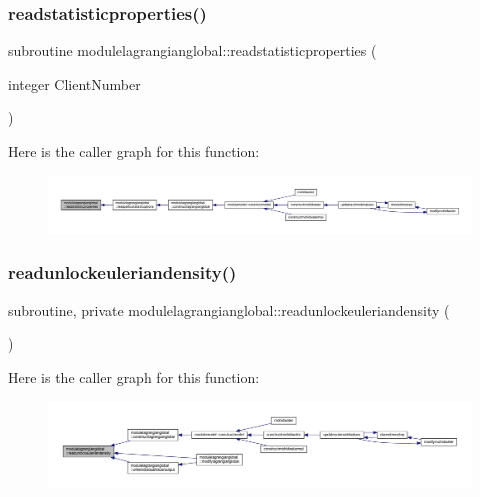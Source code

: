 \subsubsection{\texorpdfstring{readstatisticproperties()}{readstatisticproperties()}}
{\footnotesize\ttfamily subroutine modulelagrangianglobal\+::readstatisticproperties (\begin{DoxyParamCaption}\item[{integer}]{Client\+Number }\end{DoxyParamCaption})\hspace{0.3cm}{\ttfamily [private]}}

Here is the caller graph for this function\+:\nopagebreak
\begin{figure}[H]
\begin{center}
\leavevmode
\includegraphics[width=350pt]{namespacemodulelagrangianglobal_aead4b53bdd55ea198839d3d5eda5c768_icgraph}
\end{center}
\end{figure}
\mbox{\label{namespacemodulelagrangianglobal_a553d94d2684b09095403feab67bef598}} 
\subsubsection{\texorpdfstring{readunlockeuleriandensity()}{readunlockeuleriandensity()}}
{\footnotesize\ttfamily subroutine, private modulelagrangianglobal\+::readunlockeuleriandensity (\begin{DoxyParamCaption}{ }\end{DoxyParamCaption})\hspace{0.3cm}{\ttfamily [private]}}

Here is the caller graph for this function\+:\nopagebreak
\begin{figure}[H]
\begin{center}
\leavevmode
\includegraphics[width=350pt]{namespacemodulelagrangianglobal_a553d94d2684b09095403feab67bef598_icgraph}
\end{center}
\end{figure}
\mbox{\label{namespacemodulelagrangianglobal_ab2139b94b323af2c1671fe3b4340218f}} 
